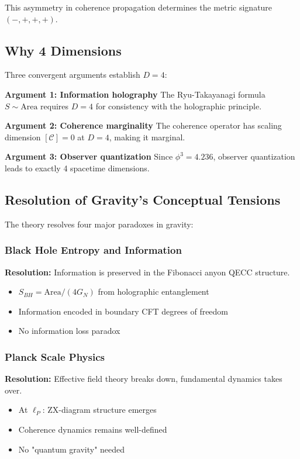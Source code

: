 \documentclass[11pt]{article}
\theoremstyle{definition}
\newcommand{\goldenratio}{\phi}
\newcommand{\coherence}{\mathcal{C}}
\begin{document}
This asymmetry in coherence propagation determines the metric signature $(-,+,+,+)$.

\subsection{Why 4 Dimensions}

Three convergent arguments establish $D = 4$:

\textbf{Argument 1: Information holography}
The Ryu-Takayanagi formula $S \sim \text{Area}$ requires $D = 4$ for consistency with the holographic principle.

\textbf{Argument 2: Coherence marginality}
The coherence operator has scaling dimension $[\coherence] = 0$ at $D = 4$, making it marginal.

\textbf{Argument 3: Observer quantization}
Since $\goldenratio^3 = 4.236$, observer quantization leads to exactly 4 spacetime dimensions.

\subsection{Resolution of Gravity's Conceptual Tensions}

The theory resolves four major paradoxes in gravity:

\subsubsection{Black Hole Entropy and Information}

\textbf{Resolution:} Information is preserved in the Fibonacci anyon QECC structure.
\begin{itemize}
\item $S_{BH} = \text{Area}/(4G_N)$ from holographic entanglement
\item Information encoded in boundary CFT degrees of freedom
\item No information loss paradox
\end{itemize}

\subsubsection{Planck Scale Physics}

\textbf{Resolution:} Effective field theory breaks down, fundamental dynamics takes over.
\begin{itemize}
\item At $\ell_P$: ZX-diagram structure emerges
\item Coherence dynamics remains well-defined
\item No "quantum gravity" needed
\end{itemize}
\end{document}
